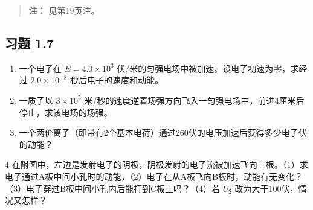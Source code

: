 \begin{quote}
\textbf{注：} 见第19页注。
\end{quote}

\subsection{习题 1.7}\label{ux4e60ux9898-1.7}

\begin{enumerate}
\def\labelenumi{\arabic{enumi}.}
\item
  一个电子在 \(E = 4.0 \times 10^{3}\)
  伏/米的匀强电场中被加速。设电子初速为零，求经过 \(2.0 \times 10^{-8}\)
  秒后电子的速度和动能。
\item
  一质子以 \(3 \times 10^{5}\)
  米/秒的速度逆着场强方向飞入一匀强电场中，前进4厘米后停止，求该电场的场强。
\item
  一个两价离子（即带有2个基本电荷）通过260伏的电压加速后获得多少电子伏的动能？
\end{enumerate}

4
在附图中，左边是发射电子的阴极，阴极发射的电子流被加速飞向三根。（1）求电子通过A板中间小孔时的动能，（2）电子在从A板飞向B板时，动能有无变化？（3）电子穿过B板中间小孔内后能打到C板上吗？（4）若
\(U_{2}\) 改为大于100伏，情况又怎样？

